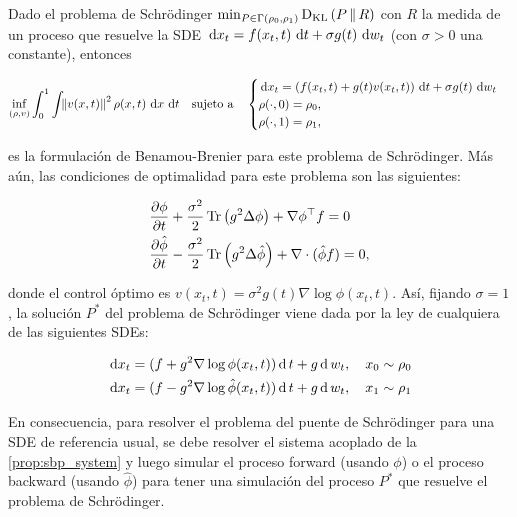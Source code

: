 \begin{prop}
	\label{prop:sbp_system}
	Dado el problema de Schrödinger $\min_{P\in\Gamma(\rho_0,\rho_1)} \operatorname{D_{KL}}\left(P\,\|\,R\right)$ con $R$ la medida de un proceso que resuelve la SDE $\,\operatorname{d}\! x_t = f(x_t,t)\,\operatorname{d}\! t + \sigma g(t)\,\operatorname{d}\! w_t$ (con $\sigma>0$ una constante), entonces

	\begin{equation*}
		\inf_{(\rho,v)} \int_0^1 \int_{} \left\lVert v(x,t) \right\rVert^2 \rho(x,t) \,\operatorname{d}\! x\,\operatorname{d}\! t
		\quad \text{sujeto a} \quad
		\begin{cases}
			\,\operatorname{d}\! x_t = \left(f(x_t,t) + g(t)v(x_t,t)\right)\,\operatorname{d}\! t + \sigma g(t)\,\operatorname{d}\! w_t\\
			\rho(\cdot,0) = \rho_0,\\
			\rho(\cdot,1) = \rho_1,
		\end{cases}
	\end{equation*}

	es la formulación de Benamou-Brenier para este problema de Schrödinger. Más aún, las condiciones de optimalidad para este problema son las siguientes:

	\begin{align*}
		&\frac{\partial\phi}{\partial t} + \frac{\sigma^2}{2}\operatorname{Tr}\left(g^2 \Delta\phi\right) + \nabla\phi^\top f = 0\\
		&\frac{\partial\hat\phi}{\partial t} - \frac{\sigma^2}{2}\operatorname{Tr}\left(g^2 \Delta\hat\phi\right) + \nabla\cdot(\hat\phi f)= 0,
	\end{align*}

	donde el control óptimo es $v(x_t,t)=\sigma^2 g(t)\nabla\log\phi(x_t,t)$. Así, fijando $\sigma=1$, la solución $P^*$ del problema de Schrödinger viene dada por la ley de cualquiera de las siguientes SDEs:

	\begin{align*}
		\,\operatorname{d}\! x_t = (f+g^2\nabla\log\phi(x_t,t))\operatorname{d} t + g\operatorname{d} w_t,\quad x_0\sim\rho_0\\
		\,\operatorname{d}\! x_t = (f-g^2\nabla\log\hat\phi(x_t,t))\operatorname{d} t + g\operatorname{d} w_t,\quad x_1\sim\rho_1
	\end{align*}

\end{prop}

En consecuencia, para resolver el problema del puente de Schrödinger para una SDE de referencia usual, se debe resolver el sistema acoplado de la \autoref{prop:sbp_system} y luego simular el proceso forward (usando $\phi$) o el proceso backward (usando $\hat\phi$) para tener una simulación del proceso $P^*$ que resuelve el problema de Schrödinger.

